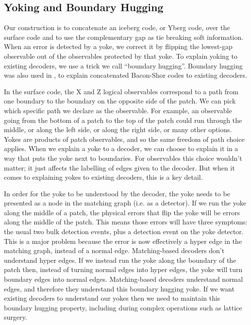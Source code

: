 \documentclass[onecolumn,unpublished,a4paper]{quantumarticle}
\theoremstyle{definition}
\theoremstyle{definition}
\theoremstyle{definition}
\begin{document}
\subsection{Yoking and Boundary Hugging}

Our construction is to concatenate an iceberg code, or Yberg code, over the surface code and to use the complementary gap as tie breaking soft information.
When an error is detected by a yoke, we correct it by flipping the lowest-gap observable out of the observables protected by that yoke.
To explain yoking to existing decoders, we use a trick we call ``boundary hugging''.
Boundary hugging was also used in \cite{lessbaconmorethreshold2023}, to explain concatenated Bacon-Shor codes to existing decoders.

In the surface code, the X and Z logical observables correspond to a path from one boundary to the boundary on the opposite side of the patch.
We can pick which specific path we declare as the observable.
For example, an observable going from the bottom of a patch to the top of the patch could run through the middle, or along the left side, or along the right side, or many other options.
Yokes are products of patch observables, and so the same freedom of path choice applies.
When we explain a yoke to a decoder, we can choose to explain it in a way that puts the yoke next to boundaries.
For observables this choice wouldn't matter; it just affects the labelling of edges given to the decoder.
But when it comes to explaining yokes to existing decoders, this is a key detail.

In order for the yoke to be understood by the decoder, the yoke needs to be presented as a node in the matching graph (i.e. as a detector).
If we run the yoke along the middle of a patch, the physical errors that flip the yoke will be errors along the middle of the patch.
This means those errors will have three symptoms: the usual two bulk detection events, plus a detection event on the yoke detector.
This is a major problem because the error is now effectively a hyper edge in the matching graph, instead of a normal edge.
Matching-based decoders don't understand hyper edges.
If we instead run the yoke along the boundary of the patch then, instead of turning normal edges into hyper edges, the yoke will turn boundary edges into normal edges.
Matching-based decoders understand normal edges, and therefore they understand this boundary hugging yoke.
If we want existing decoders to understand our yokes then we need to maintain this boundary hugging property, including during complex operations such as lattice surgery.
\end{document}
